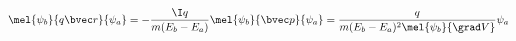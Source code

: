 
\begin{equation}
\mel{\psi_b}{q\bvec r}{\psi_a} = -\frac{\I q}{m(E_b - E_a)}\mel{\psi_b}{\bvec p}{\psi_a}
= \frac{q}{m(E_b-E_a)^2 \mel{\psi_b}{\grad V}}{\psi_a}
\end{equation}
